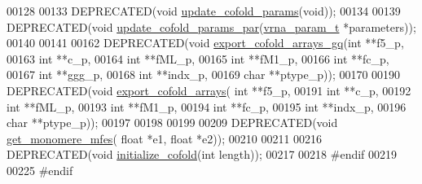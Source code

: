 \begin{DoxyCode}
00128 
00133 DEPRECATED(\textcolor{keywordtype}{void} \hyperlink{group__mfe__cofold_ga4fcbf34e77b99bfbb2333d2ab0c41a57}{update\_cofold\_params}(\textcolor{keywordtype}{void}));
00134 
00139 DEPRECATED(\textcolor{keywordtype}{void} \hyperlink{group__mfe__cofold_gaaadbd28b4e428710529ab4098fdacad3}{update\_cofold\_params\_par}(\hyperlink{group__energy__parameters_structvrna__param__s}{vrna\_param\_t} *parameters));
00140 
00141 
00162 DEPRECATED(\textcolor{keywordtype}{void} \hyperlink{group__mfe__cofold_ga5f5bf4df35d0554f6ace9579f8744c48}{export\_cofold\_arrays\_gq}(\textcolor{keywordtype}{int} **f5\_p,
00163                                         \textcolor{keywordtype}{int} **c\_p,
00164                                         \textcolor{keywordtype}{int} **fML\_p,
00165                                         \textcolor{keywordtype}{int} **fM1\_p,
00166                                         \textcolor{keywordtype}{int} **fc\_p,
00167                                         \textcolor{keywordtype}{int} **ggg\_p,
00168                                         \textcolor{keywordtype}{int} **indx\_p,
00169                                         \textcolor{keywordtype}{char} **ptype\_p));
00170 
00190 DEPRECATED(\textcolor{keywordtype}{void} \hyperlink{group__mfe__cofold_ga5cb6b59983f1f74ccc00b9b9c4e84482}{export\_cofold\_arrays}( \textcolor{keywordtype}{int} **f5\_p,
00191                                       \textcolor{keywordtype}{int} **c\_p,
00192                                       \textcolor{keywordtype}{int} **fML\_p,
00193                                       \textcolor{keywordtype}{int} **fM1\_p,
00194                                       \textcolor{keywordtype}{int} **fc\_p,
00195                                       \textcolor{keywordtype}{int} **indx\_p,
00196                                       \textcolor{keywordtype}{char} **ptype\_p));
00197 
00198 
00199 
00209 DEPRECATED(\textcolor{keywordtype}{void} \hyperlink{group__mfe__cofold_ga4958b517c613e4d2afd5bce6c1060a79}{get\_monomere\_mfes}( \textcolor{keywordtype}{float} *e1, \textcolor{keywordtype}{float} *e2));
00210 
00211 
00216 DEPRECATED(\textcolor{keywordtype}{void} \hyperlink{group__mfe__cofold_gafee0c32208aa2ac97338b6e3fbad7fa5}{initialize\_cofold}(\textcolor{keywordtype}{int} length));
00217 
00218 \textcolor{preprocessor}{#endif}
00219 
00225 \textcolor{preprocessor}{#endif}
\end{DoxyCode}
